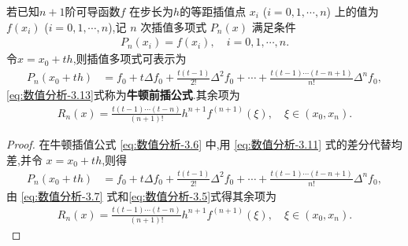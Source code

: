 \documentclass[../../main.tex]{subfiles}
\begin{document}
\begin{theorem}
若已知$n+1$阶可导函数$f$ 在步长为$h$的等距插值点 $x_i$ ($i = 0, 1, \cdots, n$) 上的值为 $f(x_i)$ ($i = 0, 1, \cdots, n$),记 $n$ 次插值多项式 $P_n(x)$ 满足条件
\begin{align*}
P_n(x_i) = f(x_i), \quad i = 0, 1, \cdots, n. 
\end{align*}
令$x=x_0+th$,则插值多项式可表示为
\begin{align}
P_n(x_0 + th) &= f_0 + t\Delta f_0 + \frac{t(t - 1)}{2!} \Delta^2 f_0 + \cdots + \frac{t(t - 1) \cdots (t - n + 1)}{n!} \Delta^n f_0, \label{eq:数值分析-3.13}
\end{align}
\eqref{eq:数值分析-3.13}式称为\textbf{牛顿前插公式}.其余项为
\begin{align}
R_n(x) = \frac{t(t - 1) \cdots (t - n)}{(n + 1)!} h^{n+1} f^{(n+1)}(\xi), \quad \xi \in (x_0, x_n). \label{eq:数值分析-3.14}
\end{align}
\end{theorem}
\begin{proof}
在牛顿插值公式 \eqref{eq:数值分析-3.6} 中,用 \eqref{eq:数值分析-3.11} 式的差分代替均差,并令 $x = x_0 + th$,则得
\begin{align*}
P_n(x_0 + th) &= f_0 + t\Delta f_0 + \frac{t(t - 1)}{2!} \Delta^2 f_0 + \cdots + \frac{t(t - 1) \cdots (t - n + 1)}{n!} \Delta^n f_0,
\end{align*}
由 \eqref{eq:数值分析-3.7} 式和\eqref{eq:数值分析-3.5}式得其余项为
\begin{align*}
R_n(x) = \frac{t(t - 1) \cdots (t - n)}{(n + 1)!} h^{n+1} f^{(n+1)}(\xi), \quad \xi \in (x_0, x_n). 
\end{align*}

\end{proof}
\end{document}
